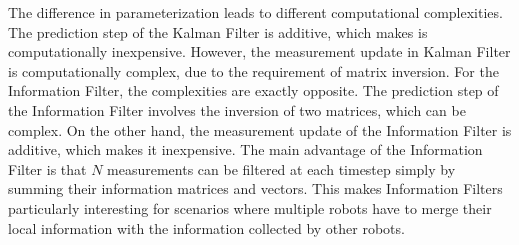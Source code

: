 The difference in parameterization leads to different computational complexities.
The prediction step of the Kalman Filter is additive, which makes is computationally inexpensive.
However, the measurement update in Kalman Filter is computationally complex, due to the requirement of matrix inversion.
For the Information Filter, the complexities are exactly opposite.
The prediction step of the Information Filter involves the inversion of two matrices, which can be complex.
On the other hand, the measurement update of the Information Filter is additive, which makes it inexpensive.
The main advantage of the Information Filter is that $N$ measurements can be filtered at each timestep simply by summing their information matrices and vectors.
This makes Information Filters particularly interesting for scenarios where multiple robots have to merge their local information with the information collected by other robots.


